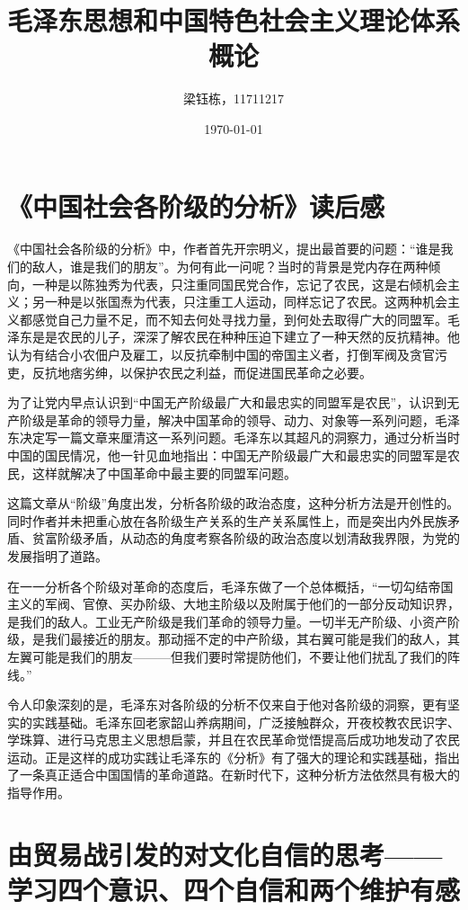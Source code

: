 \documentclass{ctexart}
\title{毛泽东思想和中国特色社会主义理论体系概论}
\author{梁钰栋，11711217}
\date{\today}
\begin{document}
\maketitle

\section{《中国社会各阶级的分析》读后感}
《中国社会各阶级的分析》中，作者首先开宗明义，提出最首要的问题：“谁是我们的敌人，谁是我们的朋友”。为何有此一问呢？当时的背景是党内存在两种倾向，一种是以陈独秀为代表，只注重同国民党合作，忘记了农民，这是右倾机会主义；另一种是以张国焘为代表，只注重工人运动，同样忘记了农民。这两种机会主义都感觉自己力量不足，而不知去何处寻找力量，到何处去取得广大的同盟军。毛泽东是是农民的儿子，深深了解农民在种种压迫下建立了一种天然的反抗精神。他认为有结合小农佃户及雇工，以反抗牵制中国的帝国主义者，打倒军阀及贪官污吏，反抗地痞劣绅，以保护农民之利益，而促进国民革命之必要。

为了让党内早点认识到“中国无产阶级最广大和最忠实的同盟军是农民”，认识到无产阶级是革命的领导力量，解决中国革命的领导、动力、对象等一系列问题，毛泽东决定写一篇文章来厘清这一系列问题。毛泽东以其超凡的洞察力，通过分析当时中国的国民情况，他一针见血地指出：中国无产阶级最广大和最忠实的同盟军是农民，这样就解决了中国革命中最主要的同盟军问题。

这篇文章从“阶级”角度出发，分析各阶级的政治态度，这种分析方法是开创性的。同时作者并未把重心放在各阶级生产关系的生产关系属性上，而是突出内外民族矛盾、贫富阶级矛盾，从动态的角度考察各阶级的政治态度以划清敌我界限，为党的发展指明了道路。

在一一分析各个阶级对革命的态度后，毛泽东做了一个总体概括，“一切勾结帝国主义的军阀、官僚、买办阶级、大地主阶级以及附属于他们的一部分反动知识界，是我们的敌人。工业无产阶级是我们革命的领导力量。一切半无产阶级、小资产阶级，是我们最接近的朋友。那动摇不定的中产阶级，其右翼可能是我们的敌人，其左翼可能是我们的朋友———但我们要时常提防他们，不要让他们扰乱了我们的阵线。”

令人印象深刻的是，毛泽东对各阶级的分析不仅来自于他对各阶级的洞察，更有坚实的实践基础。毛泽东回老家韶山养病期间，广泛接触群众，开夜校教农民识字、学珠算、进行马克思主义思想启蒙，并且在农民革命觉悟提高后成功地发动了农民运动。正是这样的成功实践让毛泽东的《分析》有了强大的理论和实践基础，指出了一条真正适合中国国情的革命道路。在新时代下，这种分析方法依然具有极大的指导作用。


\section[由贸易战引发的对文化自信的思考]{由贸易战引发的对文化自信的思考——学习四个意识、四个自信和两个维护有感}
\end{document}
